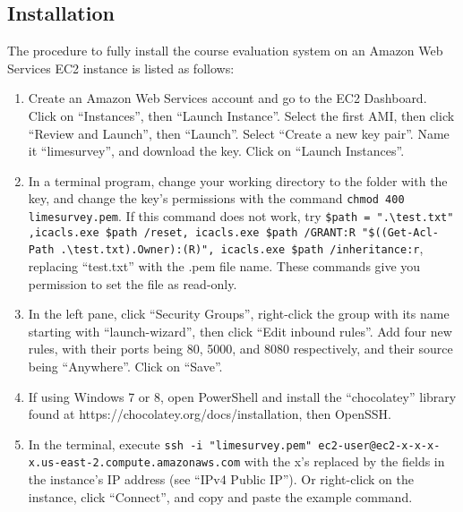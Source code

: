 \documentclass{article}
\begin{document}
\subsection{Installation}

The procedure to fully install the course evaluation system on an Amazon Web Services EC2 instance is listed as follows:

\begin{enumerate}
    \item Create an Amazon Web Services account and go to the EC2 Dashboard. Click on ``Instances'', then ``Launch Instance''. Select the first AMI, then click ``Review and Launch'', then ``Launch''. Select ``Create a new key pair''. Name it ``limesurvey'', and download the key. Click on ``Launch Instances''.

    \item In a terminal program, change your working directory to the folder with the key, and change the key's permissions with the command \verb|chmod 400 limesurvey.pem|. If this command does not work, try \verb|$path = ".\test.txt" ,icacls.exe $path /reset, icacls.exe $path /GRANT:R |\newline \verb|"$((Get-Acl-Path .\test.txt).Owner):(R)", icacls.exe $path /inheritance:r|, replacing \newline ``test.txt'' with the .pem file name. These commands give you permission to set the file as read-only.  

    \item In the left pane, click ``Security Groups'', right-click the group with its name starting with ``launch-wizard'', then click ``Edit inbound rules''. Add four new rules, with their ports being 80, 5000, and 8080 respectively, and their source being ``Anywhere''. Click on ``Save''.
    
    \item If using Windows 7 or 8, open PowerShell and install the ``chocolatey'' library found at \newline https://chocolatey.org/docs/installation, then OpenSSH.

    \item In the terminal, execute \verb|ssh -i "limesurvey.pem" ec2-user@ec2-x-x-x-x.us-east-2.compute|\newline\verb|.amazonaws.com| with the x’s replaced by the fields in the instance’s IP address (see ``IPv4 Public IP''). Or right-click on the instance, click ``Connect'', and copy and paste the example command.


\end{enumerate}
\end{document}

